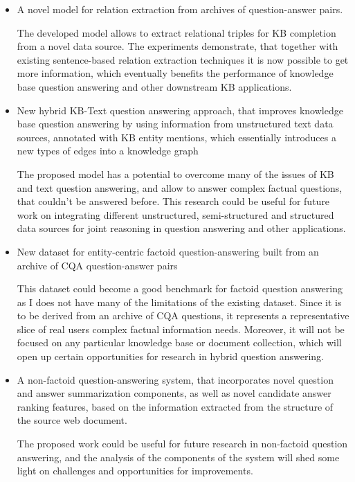 \begin{itemize}
\item A novel model for relation extraction from archives of question-answer pairs.

The developed model allows to extract relational triples for KB completion from a novel data source.
The experiments demonstrate, that together with existing sentence-based relation extraction techniques it is now possible to get more information, which eventually benefits the performance of knowledge base question answering and other downstream KB applications.

\item New hybrid KB-Text question answering approach, that improves knowledge base question answering by using information from unstructured text data sources, annotated with KB entity mentions, which essentially introduces a new types of edges into a knowledge graph

The proposed model has a potential to overcome many of the issues of KB and text question answering, and allow to answer complex factual questions, that couldn't be answered before.
This research could be useful for future work on integrating different unstructured, semi-structured and structured data sources for joint reasoning in question answering and other applications.

\item New dataset for entity-centric factoid question-answering built from an archive of CQA question-answer pairs

This dataset could become a good benchmark for factoid question answering as I does not have many of the limitations of the existing dataset.
Since it is to be derived from an archive of CQA questions, it represents a representative slice of real users complex factual information needs.
Moreover, it will not be focused on any particular knowledge base or document collection, which will open up certain opportunities for research in hybrid question answering.

\item A non-factoid question-answering system, that incorporates novel question and answer summarization components, as well as novel candidate answer ranking features, based on the information extracted from the structure of the source web document.

The proposed work could be useful for future research in non-factoid question answering, and the analysis of the components of the system will shed some light on challenges and opportunities for improvements.



\end{itemize}
